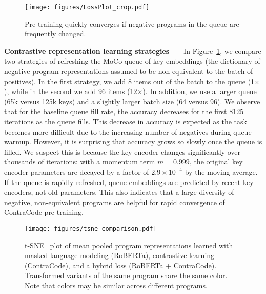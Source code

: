 \documentclass[11pt]{article}
\newcommand{\ours}[0]{ContraCode}
\begin{document}
\begin{figure}[t]
    \centering
    \texttt{[image: figures/LossPlot\_crop.pdf]}
    \caption{Pre-training quickly converges if negative programs in the queue are frequently changed.}
    \label{fig:constrastive_pretraining_accuracy}
\end{figure}
 
\textbf{Contrastive representation learning strategies}~~~~In Figure~\ref{fig:constrastive_pretraining_accuracy}, we compare two strategies of 
refreshing the MoCo queue of key embeddings (the dictionary of negative program representations assumed to be non-equivalent to the batch of positives). 
In the first strategy, we add 8 items out of the batch to the queue (1$\times$), while in the second we add 96 items (12$\times$). In addition, we use a larger queue (65k versus 125k keys) and a slightly larger batch size (64 versus 96).
We observe that for the baseline queue fill rate, the accuracy decreases for the first 8125 iterations as the queue fills. This decrease in accuracy is expected as the task becomes more difficult due to the increasing number of negatives during queue warmup. However, it is surprising that accuracy grows so slowly once the queue is filled. 
We suspect this is because the key encoder changes significantly over thousands of iterations: with a momentum term $m=0.999$, the original key encoder parameters are decayed by a factor of $2.9 \times 10^{-4}$ by the moving average. If the queue is rapidly refreshed, queue embeddings are predicted by recent key encoders, not old parameters. This also indicates that a large diversity of negative, non-equivalent programs are helpful for rapid convergence of \ours{} pre-training.


\begin{figure}
    \centering
    \texttt{[image: figures/tsne\_comparison.pdf]}
    \caption{t-SNE~\citep{tsne2008} plot of mean pooled program representations learned with masked language modeling (RoBERTa), contrastive learning (\ours{}), and a hybrid loss (RoBERTa + \ours{}). Transformed variants of the same program share the same color. Note that colors may be similar across different programs.}\label{fig:tsne}
\end{figure}
 
\end{document}
